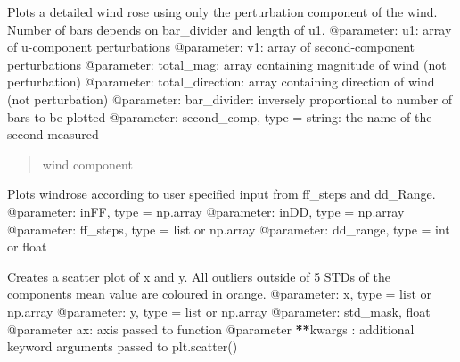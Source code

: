 \documentclass[letterpaper,10pt,english]{sphinxmanual}
\begin{document}

\begin{fulllineitems}
\label{\detokenize{index:windtunnel.plot_perturbation_rose}}
Plots a detailed wind rose using only the perturbation component of
the wind. Number of bars depends on bar\_divider and length of u1.
@parameter: u1: array of u-component perturbations
@parameter: v1: array of second-component perturbations
@parameter: total\_mag: array containing magnitude of wind (not perturbation)
@parameter: total\_direction: array containing direction of wind (not perturbation)
@parameter: bar\_divider: inversely proportional to number of bars to be plotted
@parameter: second\_comp, type = string: the name of the second measured
\begin{quote}

wind component
\end{quote}

\end{fulllineitems}


\begin{fulllineitems}
\label{\detokenize{index:windtunnel.plot_rose}}
Plots windrose according to user specified input from ff\_steps and
dd\_Range.
@parameter: inFF, type = np.array
@parameter: inDD, type = np.array
@parameter: ff\_steps, type = list or np.array
@parameter: dd\_range, type = int or float

\end{fulllineitems}


\begin{fulllineitems}
\label{\detokenize{index:windtunnel.plot_scatter}}
Creates a scatter plot of x and y. All outliers outside of 5 STDs of the
components mean value are coloured in orange.
@parameter: x, type = list or np.array
@parameter: y, type = list or np.array
@parameter: std\_mask, float
@parameter ax: axis passed to function
@parameter {\color{red}\bfseries{}**}kwargs : additional keyword arguments passed to plt.scatter()

\end{fulllineitems}
\end{document}
